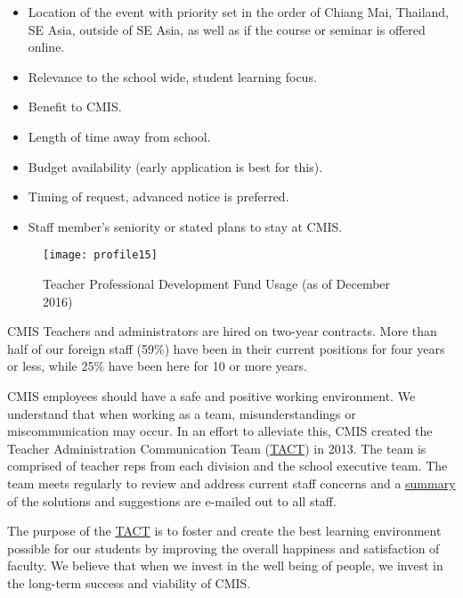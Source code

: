 \begin{itemize}
\item Location of the event with priority set in the order of Chiang Mai, Thailand, SE Asia, outside of SE Asia, as well as if the course or seminar is offered online.
\item Relevance to the school wide, student learning focus.
\item Benefit to CMIS.
\item Length of time away from school.
\item Budget availability (early application is best for this).
\item Timing of request, advanced notice is preferred.
\item Staff member’s seniority or stated plans to stay at CMIS.
\end{itemize}

\begin{figure}[H]
\centering
\texttt{[image: profile15]}
\caption{Teacher Professional Development Fund Usage (as of December 2016)}
\label{figure:pdfundusage}
\end{figure}

CMIS Teachers and administrators are hired on two-year contracts.  More than half of our foreign staff (59\%) have been in their current positions for four years or less, while 25\% have been here for 10 or more years. 


CMIS employees should have a safe and positive working environment. We understand that when working as a team, misunderstandings or miscommunication may occur.  In an effort to alleviate this, CMIS created the Teacher Administration Communication Team (\href{https://docs.google.com/a/cmis.ac.th/document/d/14nhwcw8xo3i-23Q-WUxo6KJ_c8yFKu-jTdCctt4MFcs/edit?usp=sharing}{TACT}) in 2013. The team is comprised of teacher reps from each division and the school executive team. The team meets regularly to review and address current staff concerns and a \href{https://docs.google.com/a/cmis.ac.th/document/d/1KLB4c5_LkxXzq4vP2EuNhBVPp2q_FT9qy1cBBwaS5JM/edit?usp=sharing}{summary} of the solutions and suggestions are e-mailed out to all staff.

The purpose of the \href{https://docs.google.com/document/d/12ZwL4geAPTDcm-SI6U1fRpXEKxKZ-61q54upcikt6lc/edit}{TACT} is to foster and create the best learning environment possible for our students by improving the overall happiness and satisfaction of faculty. We believe that when we invest in the well being of people, we invest in the long-term success and viability of CMIS.

